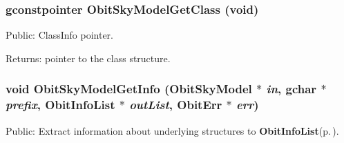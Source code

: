 \subsubsection{\setlength{\rightskip}{0pt plus 5cm}gconstpointer Obit\-Sky\-Model\-Get\-Class (void)}\label{ObitSkyModel_8c_a15}


Public: Class\-Info pointer. 

\begin{Desc}
\item[Returns:]pointer to the class structure. \end{Desc}
\subsubsection{\setlength{\rightskip}{0pt plus 5cm}void Obit\-Sky\-Model\-Get\-Info ({\bf Obit\-Sky\-Model} $\ast$ {\em in}, gchar $\ast$ {\em prefix}, {\bf Obit\-Info\-List} $\ast$ {\em out\-List}, {\bf Obit\-Err} $\ast$ {\em err})}\label{ObitSkyModel_8c_a42}


Public: Extract information about underlying structures to {\bf Obit\-Info\-List}{\rm (p.\,\pageref{structObitInfoList})}. 

